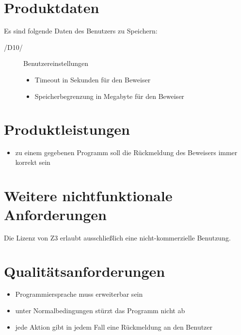 \documentclass[a4paper,10pt]{article}
\begin{document}
\section{Produktdaten}
Es sind folgende Daten des Benutzers zu Speichern:
\begin{description}
\item[/D10/] Benutzereinstellungen
\begin{itemize}
  \item Timeout in Sekunden für den Beweiser
  \item Speicherbegrenzung in Megabyte für den Beweiser
\end{itemize}
\end{description}

\section{Produktleistungen}
\begin{itemize}
  \item zu einem gegebenen Programm soll die Rückmeldung des Beweisers immer
  korrekt sein
\end{itemize}

\section{Weitere nichtfunktionale Anforderungen}
Die Lizenz von Z3 erlaubt ausschließlich eine nicht-kommerzielle Benutzung.

\section{Qualitätsanforderungen}
\begin{itemize}
  \item Programmiersprache muss erweiterbar sein
  \item unter Normalbedingungen stürzt das Programm nicht ab
  \item jede Aktion gibt in jedem Fall eine Rückmeldung an den Benutzer
\end{itemize}
\end{document}
